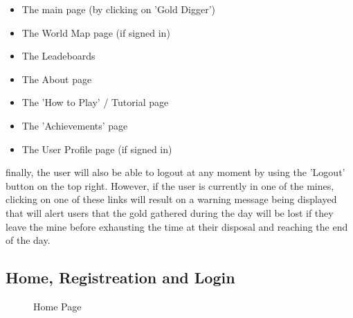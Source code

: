\documentclass{mproj}
\begin{document}
\begin{itemize}
  	\item The main page (by clicking on 'Gold Digger')
  	\item The World Map page (if signed in)
	\item The Leadeboards
	\item The About page
	\item The 'How to Play' / Tutorial page
	\item The 'Achievements' page
  	\item The User Profile page (if signed in)
\end{itemize} 

finally, the user will also be able to logout at any moment by using the 'Logout' button on the top right. However, if the user is currently in one of the mines,
clicking on one of these links will result on a warning message being displayed that will alert users that the gold gathered during the day will be lost if they leave
the mine before exhausting the time at their disposal and reaching the end of the day. 

\subsection{Home, Registreation and Login}


\begin{figure} [h] 
	\centering
	\caption{Home Page}
           \label{homepage}
\end{figure}
\end{document}
